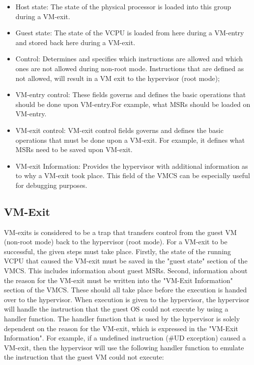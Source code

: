 \documentclass{report}
\begin{document}
\begin{spacing}{1.5}
{\large
\begin{itemize}
    \item Host state: The state of the physical processor is loaded into this group during a VM-exit.

    \item Guest state: The state of the VCPU is loaded from here during a VM-entry and stored back here during a VM-exit.

    \item Control: Determines and specifies which instructions are allowed and which ones are not allowed during non-root mode. Instructions that are defined as not allowed, will result in a VM exit to the hypervisor (root mode);

    \item VM-entry control: These fields governs and defines the basic operations that should be done upon VM-entry.For example, what MSRs should be loaded on VM-entry.
    \newline

    \item VM-exit control: VM-exit control fields governs and defines the basic operations that must be done upon a VM-exit. For example, it defines what MSRs need to be saved upon VM-exit.

    \item VM-exit Information: Provides the hypervisor with additional information as to why a VM-exit took place. This field of the VMCS can be especially useful for debugging purposes.
    \newline
\end{itemize}
}






\subsection{VM-Exit}
{\large
VM-exits is considered to be a trap that transfers control from the guest VM (non-root mode) back to the hypervisor (root mode). For a VM-exit to be successful, the given steps must take place. Firstly, the state of the running VCPU that caused the VM-exit must be saved in the "guest state" section of the VMCS. This includes information about guest MSRs. Second, information about the reason for the VM-exit must be written into the "VM-Exit Information" section of the VMCS. These should all take place before the execution is handed over to the hypervisor. When execution is given to the hypervisor, the hypervisor will handle the instruction that the guest OS could not execute by using a handler function. The handler function that is used by the hypervisor is solely dependent on the reason for the VM-exit, which is expressed in the "VM-Exit Information". For example, if a undefined instruction (\#UD exception) caused a VM-exit, then the hypervisor will use the following handler function to emulate the instruction that the guest VM could not execute:
\leavevmode\newline


}
\end{spacing}
\end{document}
